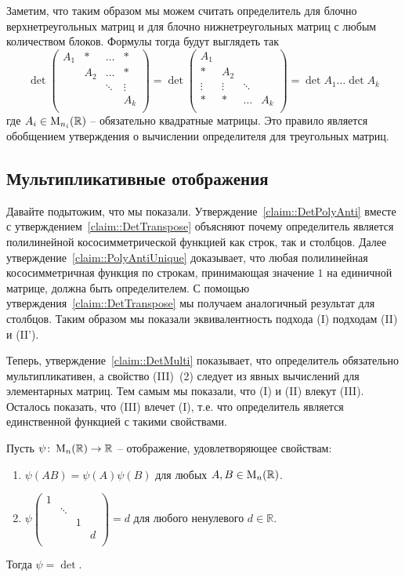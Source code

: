 Заметим, что таким образом мы можем считать определитель для блочно верхнетреугольных матриц и для блочно нижнетреугольных матриц с любым количеством блоков.
Формулы тогда будут выглядеть так
\[
\det
\begin{pmatrix}
{A_1}&{*}&{\ldots}&{*}\\
{}&{A_2}&{\ldots}&{*}\\
{}&{}&{\ddots}&{\vdots}\\
{}&{}&{}&{A_k}\\
\end{pmatrix}
=
\det
\begin{pmatrix}
{A_1}&{}&{}&{}\\
{*}&{A_2}&{}&{}\\
{\vdots}&{\vdots}&{\ddots}&{}\\
{*}&{*}&{\ldots}&{A_k}\\
\end{pmatrix}
=\det A_1 \ldots \det A_k
\]
где $A_i\in\operatorname{M}_{n_i}(\mathbb R)$ -- обязательно квадратные матрицы.
Это правило является обобщением утверждения о вычислении определителя для треугольных матриц.


\subsection{Мультипликативные отображения}

Давайте подытожим, что мы показали.
Утверждение~\ref{claim::DetPolyAnti} вместе с утверждением~\ref{claim::DetTranspose} объясняют почему определитель является полилинейной кососимметрической функцией как строк, так и столбцов.
Далее утверждение~\ref{claim::PolyAntiUnique} доказывает, что любая полилинейная кососимметричная функция по строкам, принимающая значение $1$ на единичной матрице, должна быть определителем.
С помощью утверждения~\ref{claim::DetTranspose} мы получаем аналогичный результат для столбцов.
Таким образом мы показали эквивалентность подхода (I) подходам (II) и (II').

Теперь, утверждение~\ref{claim::DetMulti} показывает, что определитель обязательно мультипликативен, а свойство (III)~(2) следует из явных вычислений для элементарных матриц.
Тем самым мы показали, что (I) и (II) влекут (III).
Осталось показать, что (III) влечет (I), т.е. что определитель является единственной функцией с такими свойствами.

\begin{claim}
\label{claim::DetMultiUnique}
Пусть $\psi\colon \operatorname{M}_{n}(\mathbb R)\to \mathbb R$ -- отображение, удовлетворяющее свойствам:
\begin{enumerate}
\item $\psi(AB) = \psi(A)\psi(B)$ для любых $A,B\in\operatorname{M}_{n}(\mathbb R)$.

\item 
$
\psi
\begin{pmatrix}
{1}&{}&{}&{}\\
{}&{\ddots}&{}&{}\\
{}&{}&{1}&{}\\
{}&{}&{}&{d}\\
\end{pmatrix}
= 
d
$ для любого ненулевого $d\in\mathbb R$.
\end{enumerate}
Тогда $\psi = \det$.
\end{claim}

